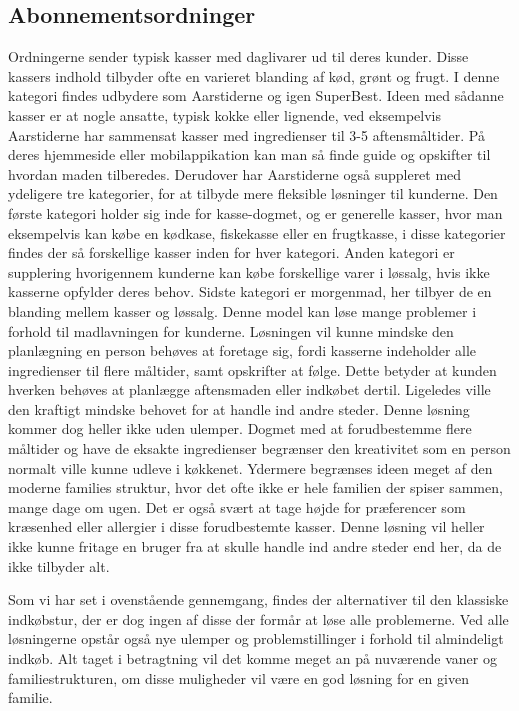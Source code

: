\subsection{Abonnementsordninger}
Ordningerne sender typisk kasser med daglivarer ud til deres kunder.
Disse kassers indhold tilbyder ofte en varieret blanding af kød, grønt og frugt.
I denne kategori findes udbydere som Aarstiderne og igen SuperBest\citep{SOTA_MP_AAR, SOTA_MP_SB}.
Ideen med sådanne kasser er at nogle ansatte, typisk kokke eller lignende, ved eksempelvis Aarstiderne har sammensat kasser med ingredienser til 3-5 aftensmåltider.
På deres hjemmeside eller mobilappikation kan man så finde guide og opskifter til hvordan maden tilberedes.
Derudover har Aarstiderne også suppleret med ydeligere tre kategorier, for at tilbyde mere fleksible løsninger til kunderne.
Den første kategori holder sig inde for kasse-dogmet, og er generelle kasser, hvor man eksempelvis kan købe en kødkase, fiskekasse eller en frugtkasse, i disse kategorier findes der så forskellige kasser inden for hver kategori.
Anden kategori er supplering hvorigennem kunderne kan købe forskellige varer i løssalg, hvis ikke kasserne opfylder deres behov.
Sidste kategori er morgenmad, her tilbyer de en blanding mellem kasser og løssalg.
Denne model kan løse mange problemer i forhold til madlavningen for kunderne.
Løsningen vil kunne mindske den planlægning en person behøves at foretage sig, fordi kasserne indeholder alle ingredienser til flere måltider, samt opskrifter at følge.
Dette betyder at kunden  hverken behøves at planlægge aftensmaden eller indkøbet dertil.
Ligeledes ville den kraftigt mindske behovet for at handle ind andre steder.
Denne løsning kommer dog heller ikke uden ulemper.
Dogmet med at forudbestemme flere måltider og have de eksakte ingredienser begrænser den kreativitet som en person normalt ville kunne udleve i køkkenet.
Ydermere begrænses ideen meget af den moderne families struktur, hvor det ofte ikke er hele familien der spiser sammen, mange dage om ugen.
Det er også svært at tage højde for præferencer som kræsenhed eller allergier i disse forudbestemte kasser.
Denne løsning vil heller ikke kunne fritage en bruger fra at skulle handle ind andre steder end her, da de ikke tilbyder alt.

Som vi har set i ovenstående gennemgang, findes der alternativer til den klassiske indkøbstur, der er dog ingen af disse der formår at løse alle problemerne.
Ved alle løsningerne opstår også nye ulemper og problemstillinger i forhold til almindeligt indkøb.
Alt taget i betragtning vil det komme meget an på nuværende vaner og familiestrukturen, om disse muligheder vil være en god løsning for en given familie.

